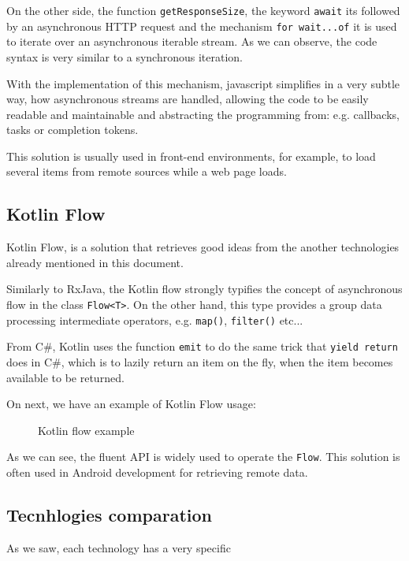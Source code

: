 On the other side, the function \texttt{getResponseSize}, the keyword \texttt{await} its followed by an asynchronous HTTP request and the mechanism \texttt{for wait...of} it is used to iterate over an asynchronous iterable stream. As we can observe, the code syntax is very similar to a synchronous iteration. 

With the implementation of this mechanism, javascript simplifies in a very subtle way, how asynchronous streams are handled, allowing the code to be easily readable and maintainable and abstracting the programming from: e.g. callbacks, tasks or completion tokens.

This solution is usually used in front-end environments, for example, to load several items from remote sources while a web page loads.



\subsection{Kotlin Flow}

Kotlin Flow, is a solution that retrieves good ideas from the another technologies already mentioned in this document.

Similarly to RxJava, the Kotlin flow strongly typifies the concept of asynchronous flow in the class \texttt{Flow<T>}. 
On the other hand, this type provides a group data processing intermediate operators, e.g. \texttt{map()}, \texttt{filter()} etc...  

From C\#, Kotlin uses the function \texttt{emit} to do the same trick that \texttt{yield return} does in C\#, which is to lazily return an item on the fly, when the item becomes available to be returned.

On next, we have an example of Kotlin Flow usage:


\clearpage
	\begin{figure}[H]
		\centering
		\caption{Kotlin flow example}
		\label{fig:kotlinflow}
	\end{figure}
\clearpage

As we can see, the fluent API is widely used to operate the \texttt{Flow}. This solution is often used in Android development for retrieving remote data.




\subsection{Tecnhlogies comparation}

As we saw, each technology has a very specific 